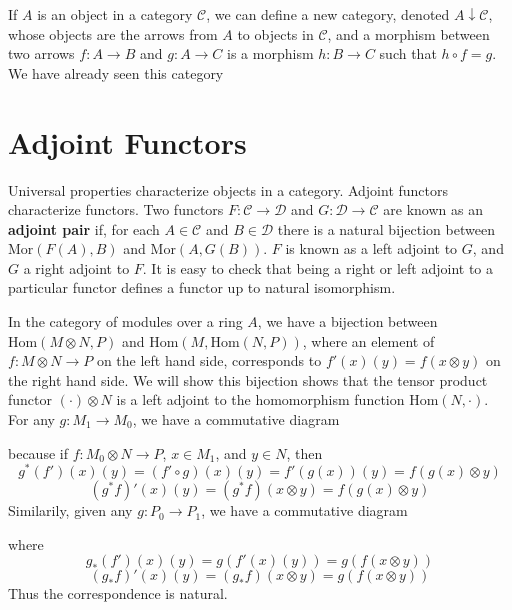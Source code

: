 If $A$ is an object in a category $\mathcal{C}$, we can define a new category, denoted $A \downarrow \mathcal{C}$, whose objects are the arrows from $A$ to objects in $\mathcal{C}$, and a morphism between two arrows $f: A \to B$ and $g: A \to C$ is a morphism $h: B \to C$ such that $h \circ f = g$. We have already seen this category






\section{Adjoint Functors}

Universal properties characterize objects in a category. Adjoint functors characterize functors. Two functors $F: \mathcal{C} \to \mathcal{D}$ and $G: \mathcal{D} \to \mathcal{C}$ are known as an {\bf adjoint pair} if, for each $A \in \mathcal{C}$ and $B \in \mathcal{D}$ there is a natural bijection between $\text{Mor}(F(A), B)$ and $\text{Mor}(A,G(B))$. $F$ is known as a left adjoint to $G$, and $G$ a right adjoint to $F$. It is easy to check that being a right or left adjoint to a particular functor defines a functor up to natural isomorphism.

\begin{example}
    In the category of modules over a ring $A$, we have a bijection between $\text{Hom}(M \otimes N, P)$ and $\text{Hom}(M, \text{Hom}(N,P))$, where an element of $f: M \otimes N \to P$ on the left hand side, corresponds to $f'(x)(y) = f(x \otimes y)$ on the right hand side. We will show this bijection shows that the tensor product functor $(\cdot) \otimes N$ is a left adjoint to the homomorphism function $\text{Hom}(N,\cdot)$. For any $g: M_1 \to M_0$, we have a commutative diagram
    \begin{center}
    \end{center}
    because if $f: M_0 \otimes N \to P$, $x \in M_1$, and $y \in N$, then
    \[ g^*(f')(x)(y) = (f' \circ g)(x)(y) = f'(g(x))(y) = f(g(x) \otimes y) \]
    \[ (g^* f)'(x)(y) = (g^* f)(x \otimes y) = f(g(x) \otimes y) \]
    Similarily, given any $g: P_0 \to P_1$, we have a commutative diagram
    \begin{center}
    \end{center}
    where
    \[ g_*(f')(x)(y) = g(f'(x)(y)) = g(f(x \otimes y)) \]
    \[ (g_* f)'(x)(y) = (g_* f)(x \otimes y) = g(f(x \otimes y)) \]
    Thus the correspondence is natural.
\end{example}

